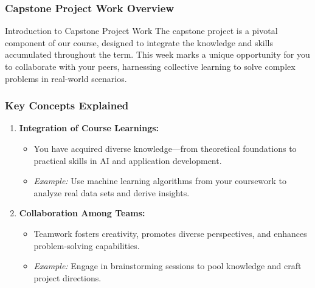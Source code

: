 \documentclass[aspectratio=169]{beamer}
\begin{document}
\frame{\titlepage}

\begin{frame}[fragile]
    \frametitle{Capstone Project Work Overview}
    \begin{block}{Introduction to Capstone Project Work}
        The capstone project is a pivotal component of our course, designed to integrate the knowledge and skills accumulated throughout the term. This week marks a unique opportunity for you to collaborate with your peers, harnessing collective learning to solve complex problems in real-world scenarios.
    \end{block}
\end{frame}

\begin{frame}[fragile]
    \frametitle{Key Concepts Explained}
    \begin{enumerate}
        \item \textbf{Integration of Course Learnings:}
            \begin{itemize}
                \item You have acquired diverse knowledge—from theoretical foundations to practical skills in AI and application development.
                \item \textit{Example:} Use machine learning algorithms from your coursework to analyze real data sets and derive insights.
            \end{itemize}
        
        \item \textbf{Collaboration Among Teams:}
            \begin{itemize}
                \item Teamwork fosters creativity, promotes diverse perspectives, and enhances problem-solving capabilities.
                \item \textit{Example:} Engage in brainstorming sessions to pool knowledge and craft project directions.
            \end{itemize}
    \end{enumerate}
\end{frame}
\end{document}
